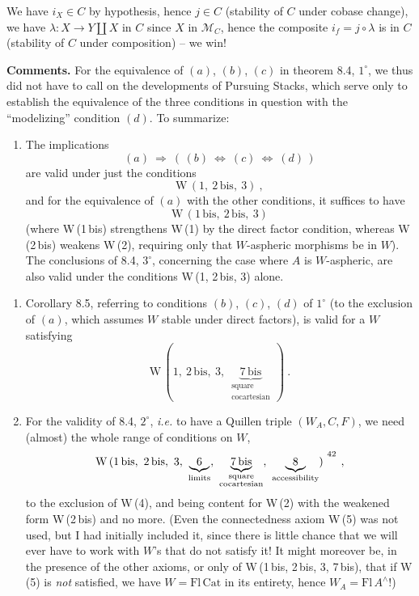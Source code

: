 \documentclass[11pt]{article}
\newcommand{\printedpage}[1]{\marginpar{\footnotesize p.~#1}}
\newcommand{\msp}[1]{\marginpar{\footnotesize [#1]}}
\begin{document}
\msp{page 114}

We have $i_X \in C$ by hypothesis, hence $j \in C$ (stability of $C$ under cobase change), we have $\lambda : X \longrightarrow Y \amalg X$ in $C$ since $X$ in $\mathcal{M}_C$, hence the composite $i_f = j \circ \lambda$ is in $C$ (stability of $C$ under composition) – we win!

\textbf{Comments.} For the equivalence of $(a)$, $(b)$, $(c)$ in theorem 8.4, $1^\circ$, we thus did not have to call on the developments of Pursuing Stacks, which serve only to establish the equivalence of the three conditions in question with the ``modelizing'' condition $(d)$. To summarize:
\begin{enumerate}[leftmargin=2.5em]
\item[$1^\circ$)] The implications
\[
(a) \ \Longrightarrow\ (\,(b) \ \Longleftrightarrow\ (c) \ \Longleftrightarrow\ (d)\,)
\]
are valid under just the conditions
\[
\mathrm{W}\,(1,\ 2\,\mathrm{bis},\ 3)\ ,
\]
and for the equivalence of $(a)$ with the other conditions, it suffices to have
\[
\mathrm{W}\,(1\,\mathrm{bis},\ 2\,\mathrm{bis},\ 3)
\]
(where W\,(1\,bis) strengthens W\,(1) by the direct factor condition, whereas W\,(2\,bis) weakens W\,(2), requiring only that $W$-aspheric morphisms be in $W$). The conclusions of 8.4, $3^\circ$, concerning the case where $A$ is $W$-aspheric, are also valid under the conditions W\,(1, 2\,bis, 3) alone.
\end{enumerate}

\msp{page 115}

\begin{enumerate}[leftmargin=2.5em]
\item[$2^\circ$)] Corollary 8.5, referring to conditions $(b)$, $(c)$, $(d)$ of $1^\circ$ (to the exclusion of $(a)$, which assumes $W$ stable under direct factors), is valid for a $W$ satisfying
\[
\mathrm{W}\,(1,\ 2\,\mathrm{bis},\ 3,\ \underbrace{7\,\mathrm{bis}}_{\substack{\text{square}\\ \text{cocartesian}}}\,)\ .
\]
\printedpage{63}
\item[$3^\circ$)] For the validity of 8.4, $2^\circ$, \textit{i.e.} to have a Quillen triple $(W_A,C,F)$, we need (almost) the whole range of conditions on $W$,
\[
\mathrm{W}\,(1\,\mathrm{bis},\ 2\,\mathrm{bis},\ 3,\ \underbrace{\ 6\ }_{\text{limits}},\ \underbrace{7\,\mathrm{bis}}_{\substack{\text{square}\\ \text{cocartesian}}},\ \underbrace{\ 8\ }_{\text{accessibility}})\ ^{\footnotemark[42]}\ ,
\]
to the exclusion of W\,(4), and being content for W\,(2) with the weakened form W\,(2\,bis) and no more. (Even the connectedness axiom W\,(5) was not used, but I had initially included it, since there is little chance that we will ever have to work with $W$'s that do not satisfy it! It might moreover be, in the presence of the other axioms, or only of W\,(1\,bis, 2\,bis, 3, 7\,bis), that if W\,(5) is \textit{not} satisfied, we have $W = \mathrm{Fl}\,\mathrm{Cat}$ in its entirety, hence $W_A = \mathrm{Fl}\,A^\wedge$!)
\end{enumerate}
\end{document}
